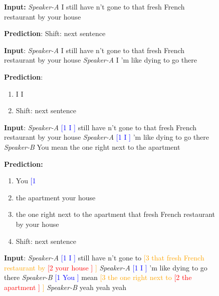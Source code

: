 \documentclass[11pt,a4paper]{article}
\begin{document}
\begin{figure}[ht!]
{\small
\noindent


\begin{tcolorbox}[colback=blue!1, outer arc=0mm,left=0mm, right=0mm,top=0mm,bottom=0mm] {\bf Input:}       
{\it Speaker-A} I still have n't gone to that fresh French restaurant by your house    

{\bf Prediction}: {\sc Shift}: next sentence
\end{tcolorbox}     

\vspace{-0.3cm}
\begin{tcolorbox}[colback=blue!1, outer arc=0mm, left=0mm,right=0mm,top=0mm,bottom=0mm]
{\bf Input}:       
{\it Speaker-A} I still have n't gone to that fresh French restaurant by your house {\it Speaker-A} I 'm like dying to go there

{\bf Prediction}: 
\begin{enumerate}[label=\Alph*,  labelwidth=!, labelindent=0pt, itemsep=0pt, parsep=0pt, topsep=1pt]
\item     I I 
\item     {\sc Shift}: next sentence
\end{enumerate}
\end{tcolorbox}

\vspace{-0.3cm}
\begin{tcolorbox}[colback=blue!1, outer arc=0mm, left=0mm,right=0mm,top=0mm,bottom=0mm]
{\bf Input}:
{\it Speaker-A} \textcolor{blue}{[1 I ]} still have n't gone to that fresh French restaurant by your house {\it Speaker-A} \textcolor{blue}{[1 I ]} 'm like dying to go there {\it Speaker-B} You mean the one right next to the apartment 

{\bf Prediction:} 
\begin{enumerate}[label=\Alph*, labelwidth=!, labelindent=0pt, itemsep=0pt, parsep=0pt, topsep=0pt]
\item You  \textcolor{blue}{[1}  \item the apartment   your house  \item the one right next to the apartment  that fresh French restaurant by your house 
\item {\sc Shift}: next sentence
\end{enumerate}
\end{tcolorbox} 

\vspace{-0.3cm}
\begin{tcolorbox}[colback=blue!1, outer arc=0mm, left=0mm,right=0mm,top=0mm,bottom=0mm]
{\bf Input}: {\it Speaker-A} \textcolor{blue}{[1 I ]} still have n't gone to \textcolor{orange}{[3 that fresh French restaurant by \textcolor{red}{ [2 your house ]} ]} {\it Speaker-A} \textcolor{blue}{[1 I ]} 'm like dying to go there {\it Speaker-B} \textcolor{blue}{[1 You ]} mean \textcolor{orange}{[3 the one right next to \textcolor{red}{[2 the apartment ]} ] } {\it Speaker-B} yeah yeah yeah


\end{tcolorbox}}
\end{figure}
\end{document}
